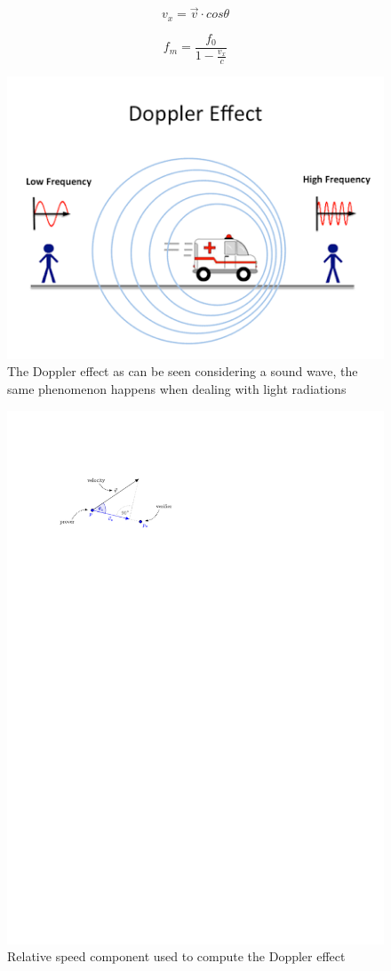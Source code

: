 \begin{equation}
    \label{gm_radspeed}
    v_x = \vec{v} \cdot cos\theta
\end{equation}

\begin{equation}
    f_m = \frac{f_0}{1-\frac{v_x}{c}}
    \label{gm_doppler}
\end{equation}

\begin{figure}
    \begin{center}
        \includegraphics[width=.37\textwidth]{gm_doppler_base.png}
        \caption{The Doppler effect as can be seen considering a sound wave, the same phenomenon happens when dealing with light radiations \cite{dopplersrc}}
        \label{gm_doppler_base}
    \end{center}
\end{figure}

\begin{figure}
    \includegraphics[width=.47\textwidth,trim={27mm 230mm 115mm 35mm},clip]{gm_doppler_spd}
    \caption{Relative speed component used to compute the Doppler effect \cite{schaefer16}}
    \label{gm_doppler_spd}
\end{figure}

